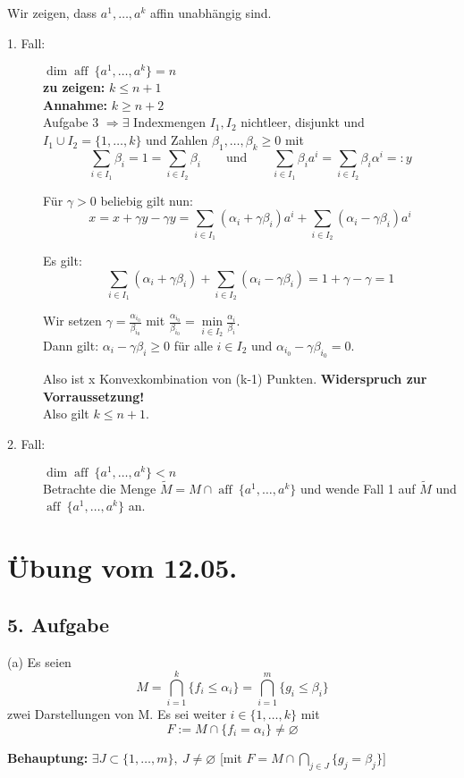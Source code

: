\documentclass[a4paper,11pt,twoside,titlepage]{article}
\newcommand{\aff}{{\operatorname{aff}\:}}
\begin{document}
Wir zeigen, dass $a^1,\ldots,a^k$ affin unabhängig sind.
\begin{description}
\item[1. Fall:] $\dim \aff\{a^1,\ldots,a^k\}=n$\\
\textbf{zu zeigen:} $k\leq n+1$\\
\textbf{Annahme:} $k\geq n+2$\\
Aufgabe 3 $\Rightarrow \exists$ Indexmengen $I_1,I_2$ nichtleer, disjunkt und $I_1\cup I_2=\{1,\ldots,k\}$ und Zahlen $\beta_1,\ldots,\beta_k\geq 0$ mit 
\[\sum_{i\in I_1}\beta_i=1=\sum_{i\in I_2}\beta_i\qquad\mbox{und}\qquad\sum_{i\in I_1}\beta_ia^i=\sum_{i\in I_2}\beta_i\alpha^i=:y\]

Für $\gamma>0$ beliebig gilt nun:
\[x=x+\gamma y-\gamma y=\sum_{i\in I_1}(\alpha_i+\gamma\beta_i)a^i+\sum_{i\in I_2}(\alpha_i-\gamma\beta_i)a^i\]

Es gilt:
\[\sum_{i\in I_1}(\alpha_i+\gamma\beta_i)+\sum_{i\in I_2}(\alpha_i-\gamma\beta_i)=1+\gamma-\gamma=1\]

Wir setzen $\gamma=\frac{\alpha_{i_0}}{\beta_{i_0}}$ mit $\frac{\alpha_{i_0}}{\beta_{i_0}}=\min\limits_{i\in I_2}\frac{\alpha_i}{\beta_i}$.\\
Dann gilt: $\alpha_i-\gamma\beta_i\geq0$ für alle $i\in I_2$ und $\alpha_{i_0}-\gamma\beta_{i_0}=0$.

Also ist x Konvexkombination von (k-1) Punkten. \textbf{Widerspruch zur Vorraussetzung!}\\
Also gilt $k\leq n+1$.

\item[2. Fall:] $\dim \aff\{a^1,\ldots,a^k\}<n$\\
Betrachte die Menge $\widetilde{M}=M\cap \aff\{a^1,\ldots,a^k\}$ und wende Fall 1 auf $\widetilde{M}$ und $\aff\{a^1,\ldots,a^k\}$ an.
\end{description}

\newpage
\section{Übung vom 12.05.}
\subsection*{5. Aufgabe}
(a) Es seien \[M=\bigcap_{i=1}^k\{f_i\leq\alpha_i\}=\bigcap_{i=1}^m\{g_i\leq\beta_i\}\] zwei Darstellungen von M. Es sei weiter $i\in\{1,\ldots,k\}$ mit \[F:=M\cap\{f_i=\alpha_i\}\neq\varnothing\]

\textbf{Behauptung:} $\exists J\subset\{1,\ldots,m\},\:J\neq\varnothing$ [mit $F=M\cap\bigcap_{j\in J}\{g_j=\beta_j\}$]
\end{document}
